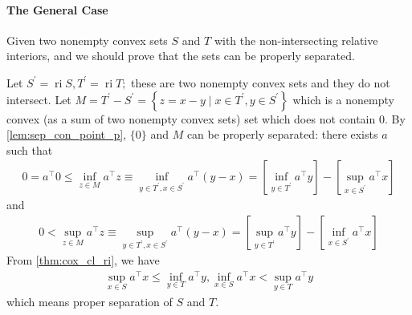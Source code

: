 \documentclass{article}
\begin{document}
\paragraph{The General Case}
Given two nonempty convex sets $S$ and $T$ with the non-intersecting relative interiors, and we should prove that the sets can be properly separated. 

Let $S^{\prime}=\operatorname{ri} S, T^{\prime}=\operatorname{ri} T ;$ these are two nonempty convex sets and they do not intersect. Let $M=T^{\prime}-S^{\prime}=\left\{z=x-y \mid x \in T^{\prime}, y \in S^{\prime}\right\}$ which is a nonempty convex (as a sum of two nonempty convex sets) set which does not contain $0$. By \cref{lem:sep_con_point_p}, $\{0\}$ and $M$ can be properly separated: there exists $a$ such that
\begin{align*}
0=a^{\top} 0 \leq \inf _{z \in M} a^{\top} z \equiv \inf _{y \in T^{\prime}, x \in S^{\prime}} a^{\top}(y-x)=\left[\inf _{y \in T^{\prime}} a^{\top} y\right]-\left[\sup _{x \in S^{\prime}} a^{\top} x\right]
\end{align*}
and
\begin{align*}
0<\sup _{z \in M} a^{\top} z \equiv \sup _{y \in T^{\prime}, x \in S^{\prime}} a^{\top}(y-x)=\left[\sup _{y \in T^{\prime}} a^{\top} y\right]-\left[\inf _{x \in S^{\prime}} a^{\top} x\right]
\end{align*}
From \cref{thm:cox_cl_ri}, we have
\begin{align*}
\sup _{x \in S} a^{\top} x \leq \inf _{y \in T} a^{\top} y, \inf _{x \in S} a^{\top} x<\sup _{y \in T} a^{\top} y
\end{align*}
which means proper separation of $S$ and $T$.
\end{document}
